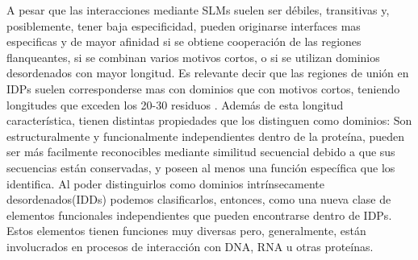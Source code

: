 





A pesar que las interacciones mediante SLMs suelen ser débiles, transitivas y, posiblemente, tener baja especificidad, pueden originarse interfaces mas especificas y de mayor afinidad si 
se obtiene cooperación de las regiones flanqueantes, si se combinan varios motivos cortos, o si se utilizan dominios desordenados con mayor longitud.
Es relevante decir que las regiones de unión en IDPs suelen corresponderse mas con dominios que con motivos cortos, teniendo longitudes que exceden los 20-30 residuos
\cite{tompa2009close,chen2006conservation,chen2006conservationB}.  
Además de esta longitud característica, tienen distintas propiedades que los distinguen como dominios:
Son estructuralmente y funcionalmente independientes dentro de la proteína, pueden ser más facilmente reconocibles mediante similitud secuencial debido a que sus secuencias están conservadas, 
y poseen al menos una función específica que los identifica.
Al poder distinguirlos como dominios intrínsecamente desordenados(IDDs) podemos clasificarlos, entonces, como una nueva clase de elementos funcionales independientes que pueden encontrarse dentro de IDPs.
Estos elementos tienen funciones muy diversas pero, generalmente, están involucrados en procesos de interacción con DNA, RNA u otras proteínas.



